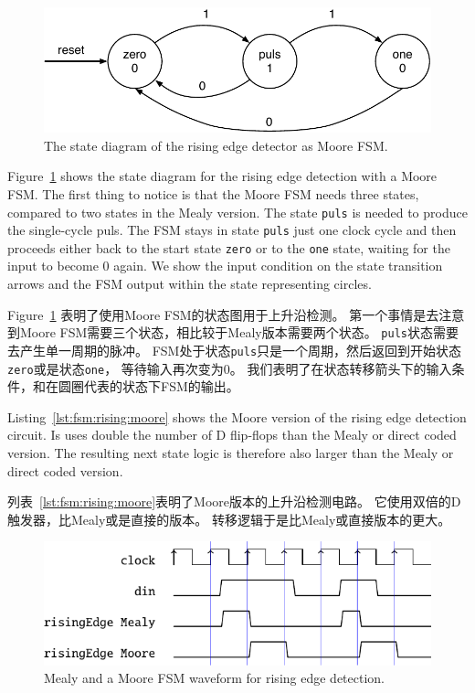 \documentclass[%
    10pt,
    headinclude, footexclude,
    openright, %
    notitlepage,
    cleardoubleempty,
    headsepline,
    pointlessnumbers,
    bibtotoc, idxtotoc,
    ]{scrbook}
\newcommand{\code}[1]{{\small{\texttt{#1}}}}
\newcommand{\scale}{0.7}
\begin{document}
\begin{figure}
  \centering
  \includegraphics[scale=\scale]{figures/state-diag-rising-moore}
  \caption{The state diagram of the rising edge detector as Moore FSM.}
  \label{fig:diag:rising:moore}
\end{figure}

Figure~\ref{fig:diag:rising:moore} shows the state diagram for the rising
edge detection with a Moore FSM. The first thing to notice is that the Moore FSM
needs three states, compared to two states in the Mealy version.
The state \code{puls} is needed to produce the single-cycle puls.
The FSM stays in state \code{puls} just one clock cycle and then
proceeds either back to the start state \code{zero} or to the \code{one}
state, waiting for the input to become 0 again.
We show the input condition on the state transition arrows and the
FSM output within the state representing circles.

Figure~\ref{fig:diag:rising:moore} 表明了使用Moore FSM的状态图用于上升沿检测。
第一个事情是去注意到Moore FSM需要三个状态，相比较于Mealy版本需要两个状态。
\code{puls}状态需要去产生单一周期的脉冲。
FSM处于状态\code{puls}只是一个周期，然后返回到开始状态\code{zero}或是状态\code{one}，
等待输入再次变为0。
我们表明了在状态转移箭头下的输入条件，和在圆圈代表的状态下FSM的输出。


Listing~\ref{lst:fsm:rising:moore} shows the Moore version of the rising edge detection
circuit. Is uses double the number of D flip-flops than the Mealy or direct
coded version. The resulting next state logic is therefore also larger
than the Mealy or direct coded version.

列表~\ref{lst:fsm:rising:moore}表明了Moore版本的上升沿检测电路。
它使用双倍的D触发器，比Mealy或是直接的版本。
转移逻辑于是比Mealy或直接版本的更大。

\begin{figure}
  \centering
  \includegraphics[scale=1]{figures/rising}
  \caption{Mealy and a  Moore FSM waveform for rising edge detection.}
  \label{fig:rising}
\end{figure}
\end{document}

